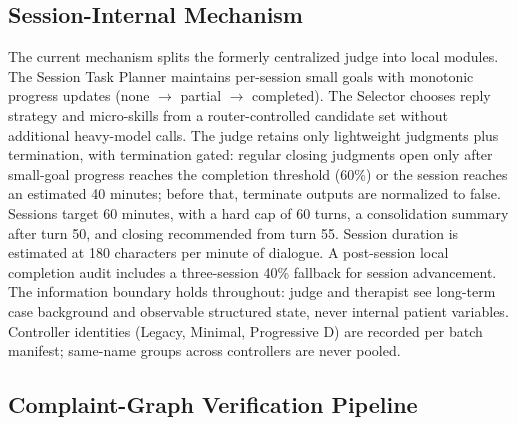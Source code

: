 \documentclass[10pt]{article}
\begin{document}
\subsection{Session-Internal Mechanism}

The current mechanism splits the formerly centralized judge into local modules.
The Session Task Planner maintains per-session small goals with monotonic progress updates (none $\rightarrow$ partial $\rightarrow$ completed).
The Selector chooses reply strategy and micro-skills from a router-controlled candidate set without additional heavy-model calls.
The judge retains only lightweight judgments plus termination, with termination gated: regular closing judgments open only after small-goal progress reaches the completion threshold (60\%) or the session reaches an estimated 40 minutes; before that, terminate outputs are normalized to false.
Sessions target 60 minutes, with a hard cap of 60 turns, a consolidation summary after turn 50, and closing recommended from turn 55.
Session duration is estimated at 180 characters per minute of dialogue.
A post-session local completion audit includes a three-session 40\% fallback for session advancement.
The information boundary holds throughout: judge and therapist see long-term case background and observable structured state, never internal patient variables.
Controller identities (Legacy, Minimal, Progressive D) are recorded per batch manifest; same-name groups across controllers are never pooled.

\subsection{Complaint-Graph Verification Pipeline}
\end{document}
